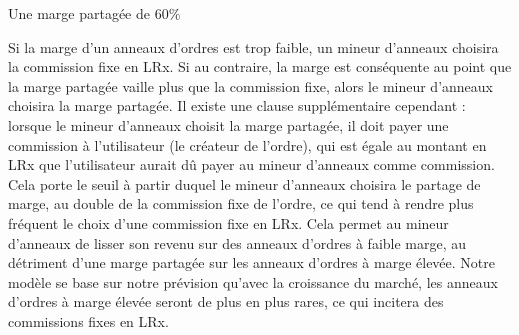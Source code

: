 \documentclass[UTF8,nofonts]{article}
\makeatletter
\newenvironment{figurehere}
 {\def\@captype{figure}}
 {}
\makeatother
\begin{document}
\begin{multicols}{2}
\begin{center}
\begin{figurehere}
\caption{Une marge partagée de 60\%}
\label{fig:marginsplit}
\end{figurehere}
\end{center}

Si la marge d'un anneaux d'ordres est trop faible, un mineur d'anneaux choisira la commission fixe en LRx. Si au contraire, la marge est conséquente au point que la marge partagée vaille plus que la commission fixe, alors le mineur d'anneaux choisira la marge partagée. Il existe une clause supplémentaire cependant : lorsque le mineur d'anneaux choisit la marge partagée, il doit payer une commission à l'utilisateur (le créateur de l'ordre), qui est égale au montant en LRx que l'utilisateur aurait dû payer au mineur d'anneaux comme commission. Cela porte le seuil à partir duquel le mineur d'anneaux choisira le partage de marge, au double de la commission fixe de l'ordre, ce qui tend à rendre plus fréquent le choix d'une commission fixe en LRx. Cela permet au mineur d'anneaux de lisser son revenu sur des anneaux d'ordres à faible marge, au détriment d'une marge partagée sur les anneaux d'ordres à marge élevée. Notre modèle se base sur notre prévision qu'avec la croissance du marché, les anneaux d'ordres à marge élevée seront de plus en plus rares, ce qui incitera des commissions fixes en LRx. 



\end{multicols}
\end{document}
